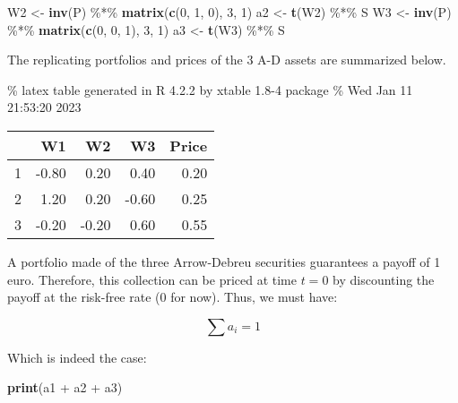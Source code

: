 \documentclass[justified]{tufte-book}
\newenvironment{Shaded}{}{}
\newcommand{\DecValTok}[1]{\textcolor[rgb]{0.25,0.63,0.44}{#1}}
\newcommand{\KeywordTok}[1]{\textcolor[rgb]{0.00,0.44,0.13}{\textbf{#1}}}
\newcommand{\NormalTok}[1]{#1}
\newcommand{\OperatorTok}[1]{\textcolor[rgb]{0.40,0.40,0.40}{#1}}
\newcommand{\StringTok}[1]{\textcolor[rgb]{0.25,0.44,0.63}{#1}}
\begin{document}
\begin{Shaded}
\begin{Highlighting}[]
\NormalTok{W2 \textless{}{-}}\StringTok{ }\KeywordTok{inv}\NormalTok{(P) }\OperatorTok{\%*\%}\StringTok{ }\KeywordTok{matrix}\NormalTok{(}\KeywordTok{c}\NormalTok{(}\DecValTok{0}\NormalTok{, }\DecValTok{1}\NormalTok{, }\DecValTok{0}\NormalTok{), }\DecValTok{3}\NormalTok{, }\DecValTok{1}\NormalTok{)}
\NormalTok{a2 \textless{}{-}}\StringTok{ }\KeywordTok{t}\NormalTok{(W2) }\OperatorTok{\%*\%}\StringTok{ }\NormalTok{S}
\NormalTok{W3 \textless{}{-}}\StringTok{ }\KeywordTok{inv}\NormalTok{(P) }\OperatorTok{\%*\%}\StringTok{ }\KeywordTok{matrix}\NormalTok{(}\KeywordTok{c}\NormalTok{(}\DecValTok{0}\NormalTok{, }\DecValTok{0}\NormalTok{, }\DecValTok{1}\NormalTok{), }\DecValTok{3}\NormalTok{, }\DecValTok{1}\NormalTok{)}
\NormalTok{a3 \textless{}{-}}\StringTok{ }\KeywordTok{t}\NormalTok{(W3) }\OperatorTok{\%*\%}\StringTok{ }\NormalTok{S}
\end{Highlighting}
\end{Shaded}

The replicating portfolios and prices of the 3 A-D assets are summarized
below.

\% latex table generated in R 4.2.2 by xtable 1.8-4 package
\% Wed Jan 11 21:53:20 2023

\begin{tabular}{rrrrr}
  \toprule 
 & W1 & W2 & W3 & Price \\ 
  \midrule  
1 & -0.80 & 0.20 & 0.40 & 0.20 \\ 
  2 & 1.20 & 0.20 & -0.60 & 0.25 \\ 
  3 & -0.20 & -0.20 & 0.60 & 0.55 \\ 
   \bottomrule 
\end{tabular}

A portfolio made of the three Arrow-Debreu securities guarantees a
payoff of 1 euro. Therefore, this collection can be priced at time \(t=0\)
by discounting the payoff at the risk-free rate (0 for now). Thus, we
must have:

\[\sum a_i = 1\]

Which is indeed the case:

\begin{Shaded}
\begin{Highlighting}[]
\KeywordTok{print}\NormalTok{(a1 }\OperatorTok{+}\StringTok{ }\NormalTok{a2 }\OperatorTok{+}\StringTok{ }\NormalTok{a3)}
\end{Highlighting}
\end{Shaded}
\end{document}
